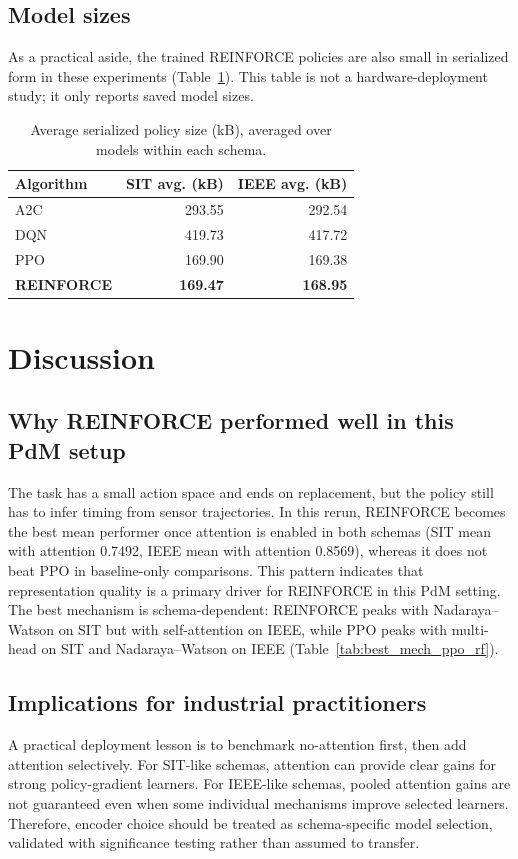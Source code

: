 \subsection{Model sizes}
As a practical aside, the trained \textsc{REINFORCE} policies are also small in serialized form in these experiments (Table~\ref{tab:model_size_summary}). This table is not a hardware-deployment study; it only reports saved model sizes.

\begin{table}[htbp]
\centering
\caption{Average serialized policy size (kB), averaged over models within each schema.}
\label{tab:model_size_summary}
\begin{tabular}{l r r}
\toprule
	\textbf{Algorithm} & \textbf{SIT avg. (kB)} & \textbf{IEEE avg. (kB)}\\
	\midrule
	A2C & 293.55 & 292.54\\
	DQN & 419.73 & 417.72\\
	PPO & 169.90 & 169.38\\
	\textbf{REINFORCE} & \textbf{169.47} & \textbf{168.95}\\
\bottomrule
\end{tabular}
\end{table}

\section{Discussion}
\label{sec:discussion}
\subsection{Why REINFORCE performed well in this PdM setup}
The task has a small action space and ends on replacement, but the policy still has to infer timing from sensor trajectories. In this rerun, \textsc{REINFORCE} becomes the best mean performer once attention is enabled in both schemas (SIT mean with attention 0.7492, IEEE mean with attention 0.8569), whereas it does not beat \textsc{PPO} in baseline-only comparisons. This pattern indicates that representation quality is a primary driver for \textsc{REINFORCE} in this PdM setting.
The best mechanism is schema-dependent: \textsc{REINFORCE} peaks with Nadaraya--Watson on SIT but with self-attention on IEEE, while \textsc{PPO} peaks with multi-head on SIT and Nadaraya--Watson on IEEE (Table~\ref{tab:best_mech_ppo_rf}).

\subsection{Implications for industrial practitioners}
A practical deployment lesson is to benchmark no-attention first, then add attention selectively. For SIT-like schemas, attention can provide clear gains for strong policy-gradient learners. For IEEE-like schemas, pooled attention gains are not guaranteed even when some individual mechanisms improve selected learners. Therefore, encoder choice should be treated as schema-specific model selection, validated with significance testing rather than assumed to transfer.

